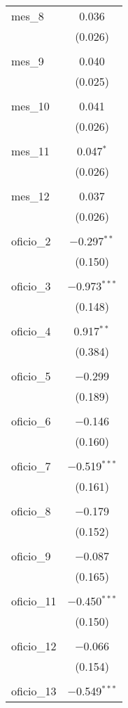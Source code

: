 \begin{table}[!htbp]
\begin{tabular}{@{\extracolsep{5pt}}lc}
 mes\_8 & 0.036 \\ 
  & (0.026) \\ 
  & \\ 
 mes\_9 & 0.040 \\ 
  & (0.025) \\ 
  & \\ 
 mes\_10 & 0.041 \\ 
  & (0.026) \\ 
  & \\ 
 mes\_11 & 0.047$^{*}$ \\ 
  & (0.026) \\ 
  & \\ 
 mes\_12 & 0.037 \\ 
  & (0.026) \\ 
  & \\ 
 oficio\_2 & $-$0.297$^{**}$ \\ 
  & (0.150) \\ 
  & \\ 
 oficio\_3 & $-$0.973$^{***}$ \\ 
  & (0.148) \\ 
  & \\ 
 oficio\_4 & 0.917$^{**}$ \\ 
  & (0.384) \\ 
  & \\ 
 oficio\_5 & $-$0.299 \\ 
  & (0.189) \\ 
  & \\ 
 oficio\_6 & $-$0.146 \\ 
  & (0.160) \\ 
  & \\ 
 oficio\_7 & $-$0.519$^{***}$ \\ 
  & (0.161) \\ 
  & \\ 
 oficio\_8 & $-$0.179 \\ 
  & (0.152) \\ 
  & \\ 
 oficio\_9 & $-$0.087 \\ 
  & (0.165) \\ 
  & \\ 
 oficio\_11 & $-$0.450$^{***}$ \\ 
  & (0.150) \\ 
  & \\ 
 oficio\_12 & $-$0.066 \\ 
  & (0.154) \\ 
  & \\ 
 oficio\_13 & $-$0.549$^{***}$ \\ 

\end{tabular}
\end{table}
